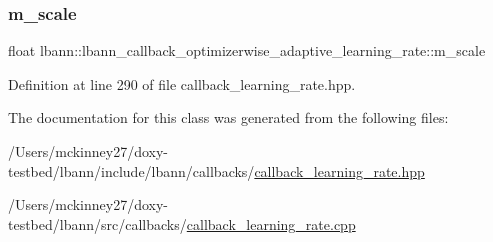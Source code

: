\subsubsection{\texorpdfstring{m\+\_\+scale}{m\_scale}}
{\footnotesize\ttfamily float lbann\+::lbann\+\_\+callback\+\_\+optimizerwise\+\_\+adaptive\+\_\+learning\+\_\+rate\+::m\+\_\+scale\hspace{0.3cm}{\ttfamily [private]}}



Definition at line 290 of file callback\+\_\+learning\+\_\+rate.\+hpp.



The documentation for this class was generated from the following files\+:\begin{DoxyCompactItemize}
\item 
/\+Users/mckinney27/doxy-\/testbed/lbann/include/lbann/callbacks/\hyperlink{callback__learning__rate_8hpp}{callback\+\_\+learning\+\_\+rate.\+hpp}\item 
/\+Users/mckinney27/doxy-\/testbed/lbann/src/callbacks/\hyperlink{callback__learning__rate_8cpp}{callback\+\_\+learning\+\_\+rate.\+cpp}\end{DoxyCompactItemize}
